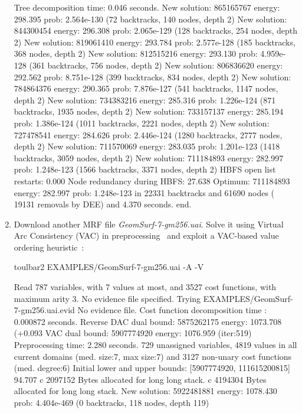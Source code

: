 \begin{enumerate}
{\begin{DoxyCode}
Tree decomposition time: 0.046 seconds.
New solution: 865165767 energy: 298.395 prob: 2.564e-130 (72 backtracks, 140 nodes, depth 2)
New solution: 844300454 energy: 296.308 prob: 2.065e-129 (128 backtracks, 254 nodes, depth 2)
New solution: 819061410 energy: 293.784 prob: 2.577e-128 (185 backtracks, 368 nodes, depth 2)
New solution: 812515216 energy: 293.130 prob: 4.959e-128 (361 backtracks, 756 nodes, depth 2)
New solution: 806836620 energy: 292.562 prob: 8.751e-128 (399 backtracks, 834 nodes, depth 2)
New solution: 784864376 energy: 290.365 prob: 7.876e-127 (541 backtracks, 1147 nodes, depth 2)
New solution: 734383216 energy: 285.316 prob: 1.226e-124 (871 backtracks, 1935 nodes, depth 2)
New solution: 733157137 energy: 285.194 prob: 1.386e-124 (1011 backtracks, 2221 nodes, depth 2)
New solution: 727478541 energy: 284.626 prob: 2.446e-124 (1280 backtracks, 2777 nodes, depth 2)
New solution: 711570069 energy: 283.035 prob: 1.201e-123 (1418 backtracks, 3059 nodes, depth 2)
New solution: 711184893 energy: 282.997 prob: 1.248e-123 (1566 backtracks, 3371 nodes, depth 2)
HBFS open list restarts: 0.000 %
Node redundancy during HBFS: 27.638 %
Optimum: 711184893 energy: 282.997 prob: 1.248e-123 in 22331 backtracks and 61690 nodes ( 19131 removals by DEE) and 4.370 seconds.
end.
\end{DoxyCode}}
\item Download another MRF file {\em GeomSurf-7-gm256.uai}. Solve it using Virtual Arc Consistency (VAC) in preprocessing~\cite{Cooper08} and exploit a VAC-based value ordering heuristic~\cite{Cooper10a}:
\begin{DoxyCode}
	toulbar2 EXAMPLES/GeomSurf-7-gm256.uai -A -V
\end{DoxyCode}
{\scriptsize
\begin{DoxyCode}
Read 787 variables, with 7 values at most, and 3527 cost functions, with maximum arity 3.
No evidence file specified. Trying EXAMPLES/GeomSurf-7-gm256.uai.evid
No evidence file. 
Cost function decomposition time : 0.000872 seconds.
Reverse DAC dual bound: 5875262175 energy: 1073.708 (+0.093%
VAC dual bound: 5907774920 energy: 1076.959 (iter:519)
Preprocessing time: 2.280 seconds.
729 unassigned variables, 4819 values in all current domains (med. size:7, max size:7) and 3127 non-unary cost functions (med. degree:6)
Initial lower and upper bounds: [5907774920, 111615200815] 94.707%
c 2097152 Bytes allocated for long long stack.
c 4194304 Bytes allocated for long long stack.
New solution: 5922481881 energy: 1078.430 prob: 4.404e-469 (0 backtracks, 118 nodes, depth 119)

\end{DoxyCode}}
\end{enumerate}
